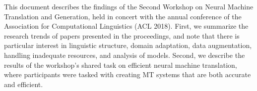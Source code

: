 This document describes the findings of the Second Workshop on Neural Machine Translation and Generation, held in concert with the annual conference of the Association for Computational Linguistics (ACL 2018). First, we summarize the research trends of papers presented in the proceedings, and note that there is particular interest in linguistic structure, domain adaptation, data augmentation, handling inadequate resources, and analysis of models. Second, we describe the results of the workshop's shared task on efficient neural machine translation, where participants were tasked with creating MT systems that are both accurate and efficient.
